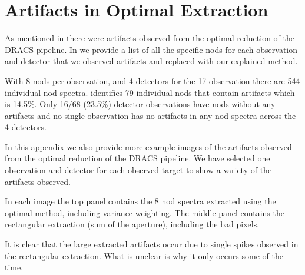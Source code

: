 
\chapter{Artifacts in Optimal Extraction} %
\label{appendix:artifacts}



As mentioned in  there were artifacts observed from the optimal reduction of the DRACS pipeline. In  we provide a list of all the specific nods for each observation and detector that we observed artifacts and replaced with our explained method.  

With 8 nods per observation, and 4 detectors for the 17 observation there are 544 individual nod spectra.  identifies 79 individual nods that contain artifacts which is 14.5\%.   Only 16/68 (23.5\%) detector observations have nods without any artifacts and no single observation has no artifacts in any nod spectra across the 4 detectors.


In this appendix we also provide more example images of the artifacts observed from the optimal reduction of the DRACS pipeline. We have selected one observation and detector for each observed target to show a variety of the artifacts observed.

In each image the top panel contains the 8 nod spectra extracted using the optimal method, including variance weighting. The middle panel contains the rectangular extraction (sum of the aperture), including the bad pixels.

It is clear that the large extracted artifacts occur due to single spikes observed in the rectangular extraction. What is unclear is why it only occurs some of the time.
 

 
